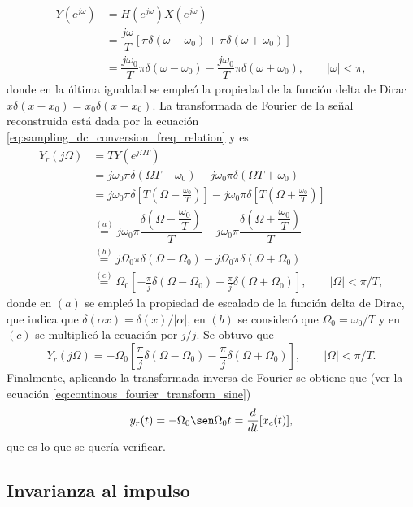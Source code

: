 \documentclass[a4paper]{report}
\begin{document}
\begin{align*}
 Y(e^{j\omega})&=H(e^{j\omega})X(e^{j\omega})\\
  &=\dfrac{j\omega}{T}\left[\pi\delta(\omega-\omega_0)+\pi\delta(\omega+\omega_0)\right]\\
  &=\dfrac{j\omega_0}{T}\pi\delta(\omega-\omega_0)-\dfrac{j\omega_0}{T}\pi\delta(\omega+\omega_0),
  \qquad |\omega|<\pi,
\end{align*}
donde en la última igualdad se empleó la propiedad de la función delta de Dirac \(x\delta(x-x_0)=x_0\delta(x-x_0)\). La transformada de Fourier de la señal reconstruida está dada por la ecuación \ref{eq:sampling_dc_conversion_freq_relation} y es
\begin{align*}
 Y_r(j\Omega)&=TY(e^{j\Omega T})\\
  &=j\omega_0\pi\delta(\Omega T-\omega_0)-j\omega_0\pi\delta(\Omega T+\omega_0)\\
  &=j\omega_0\pi\delta\left[T\left(\Omega-\frac{\omega_0}{T}\right)\right]-j\omega_0\pi\delta\left[T\left(\Omega+\frac{\omega_0}{T}\right)\right]\\
  &\overset{(a)}{=}j\omega_0\pi\dfrac{\delta\left(\Omega-\dfrac{\omega_0}{T}\right)}{T}-j\omega_0\pi\dfrac{\delta\left(\Omega+\dfrac{\omega_0}{T}\right)}{T}\\
  &\overset{(b)}{=}j\Omega_0\pi\delta(\Omega-\Omega_0)-j\Omega_0\pi\delta(\Omega+\Omega_0)\\
  &\overset{(c)}{=}\Omega_0\left[-\frac{\pi}{j}\delta(\Omega-\Omega_0)+\frac{\pi}{j}\delta(\Omega+\Omega_0)\right],
  \qquad|\Omega|<\pi/T,
\end{align*}
donde en \((a)\) se empleó la propiedad de escalado de la función delta de Dirac, que indica que \(\delta(\alpha x)=\delta(x)/|\alpha|\), en \((b)\) se consideró que \(\Omega_0=\omega_0/T\) y en \((c)\) se multiplicó la ecuación por \(j/j\). Se obtuvo que
\[
 Y_r(j\Omega)=-\Omega_0\left[\frac{\pi}{j}\delta(\Omega-\Omega_0)-\frac{\pi}{j}\delta(\Omega+\Omega_0)\right],
 \qquad|\Omega|<\pi/T.
\]
Finalmente, aplicando la transformada inversa de Fourier se obtiene que (ver la ecuación \ref{eq:continous_fourier_transform_sine})
\[
 y_r(t)=-\Omega_0\sen\Omega_0t=\frac{d}{dt}[x_c(t)],
\]
que es lo que se quería verificar.

\subsection{Invarianza al impulso}
\end{document}

